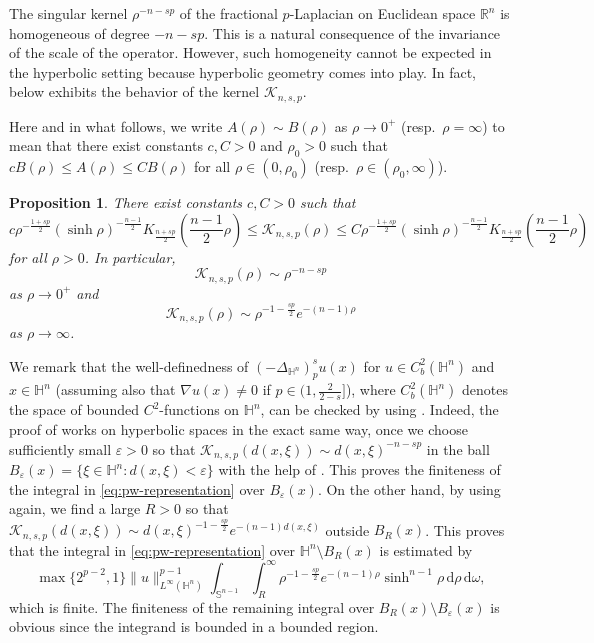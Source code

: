 \documentclass[11pt]{amsart}
\theoremstyle{plain}
\newtheorem{proposition}[theorem]{Proposition}
\theoremstyle{definition}
\numberwithin{equation}{section}
\begin{document}
The singular kernel $\rho^{-n-sp}$ of the fractional $p$-Laplacian on Euclidean space $\mathbb{R}^{n}$ is homogeneous of degree $-n-sp$. This is a natural consequence of the invariance of the scale of the operator. However, such homogeneity cannot be expected in the hyperbolic setting because hyperbolic geometry comes into play. In fact,  below exhibits the behavior of the kernel $\mathcal{K}_{n, s, p}$.

Here and in what follows, we write $A(\rho) \sim B(\rho)$ as $\rho\to 0^+$ (resp.\ $\rho=\infty$) to mean that there exist constants $c, C>0$ and $\rho_0>0$ such that $cB(\rho) \leq A(\rho) \leq CB(\rho)$ for all $\rho \in (0, \rho_0)$ (resp.\ $\rho \in (\rho_0, \infty)$).

\begin{proposition}\label{prop-asymptotic}
There exist constants $c, C>0$ such that
\begin{equation*}
c\rho^{-\frac{1+sp}{2}} (\sinh\rho)^{-\frac{n-1}{2}} K_{\frac{n+sp}{2}}\left(\frac{n-1}{2}\rho\right) \leq \mathcal{K}_{n,s,p}(\rho) \leq C\rho^{-\frac{1+sp}{2}} (\sinh\rho)^{-\frac{n-1}{2}} K_{\frac{n+sp}{2}}\left(\frac{n-1}{2}\rho\right)
\end{equation*}
for all $\rho > 0$. In particular,
\begin{equation*}
\mathcal{K}_{n,s,p}(\rho) \sim \rho^{-n-sp}
\end{equation*}
as $\rho \to 0^+$ and
\begin{equation*}
\mathcal{K}_{n,s,p}(\rho) \sim \rho^{-1-\frac{sp}{2}}e^{-(n-1)\rho}
\end{equation*}
as $\rho \to \infty$.
\end{proposition}

We remark that the well-definedness of $(-\Delta_{\mathbb{H}^n})_p^su(x)$ for $u \in C^2_b(\mathbb{H}^n)$ and $x \in \mathbb{H}^n$ (assuming also that $\nabla u(x) \neq 0$ if $p \in (1, \frac{2}{2-s}]$), where $C^{2}_{b}(\mathbb{H}^{n})$ denotes the space of bounded $C^{2}$-functions on $\mathbb{H}^{n}$, can be checked by using . Indeed, the proof of \cite[Lemma~3.6]{KKL19} works on hyperbolic spaces in the exact same way, once we choose sufficiently small $\varepsilon>0$ so that $\mathcal{K}_{n, s, p}(d(x, \xi)) \sim d(x, \xi)^{-n-sp}$ in the ball $B_\varepsilon(x)=\{\xi \in \mathbb{H}^n: d(x, \xi) < \varepsilon\}$ with the help of . This proves the finiteness of the integral in \eqref{eq:pw-representation} over $B_\varepsilon(x)$. On the other hand, by using  again, we find a large $R>0$ so that $\mathcal{K}_{n, s, p}(d(x, \xi)) \sim d(x, \xi)^{-1-\frac{sp}{2}}e^{-(n-1)d(x, \xi)}$ outside $B_R(x)$. This proves that the integral in \eqref{eq:pw-representation} over $\mathbb{H}^n \setminus B_R(x)$ is estimated by
\begin{equation*}
\max\{2^{p-2}, 1\} \|u\|_{L^\infty(\mathbb{H}^n)}^{p-1} \int_{\mathbb{S}^{n-1}} \int_R^\infty \rho^{-1-\frac{sp}{2}}e^{-(n-1)\rho} \sinh^{n-1} \rho \,\mathrm{d}\rho \,\mathrm{d}\omega,
\end{equation*}
which is finite. The finiteness of the remaining integral over $B_R(x) \setminus B_\varepsilon(x)$ is obvious since the integrand is bounded in a bounded region.
\end{document}
